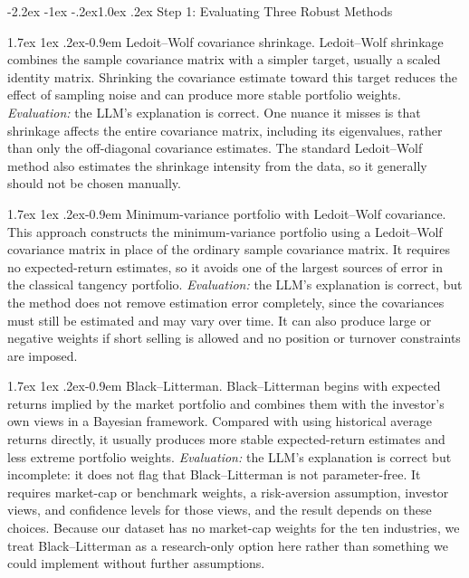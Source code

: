 \documentclass[11pt]{article}
\makeatletter
\renewcommand\subsection{\@startsection{subsection}{2}{0pt}%
  {-2.2ex \@plus -1ex \@minus -.2ex}{1.0ex \@plus .2ex}%
  {\normalfont\bfseries\normalsize\color{psink}}}
\renewcommand\paragraph{\@startsection{paragraph}{4}{0pt}%
  {1.7ex \@plus 1ex \@minus .2ex}{-0.9em}%
  {\normalfont\bfseries\normalsize\color{psink}}}
\makeatother
\begin{document}
\subsection{Step 1: Evaluating Three Robust Methods}

\paragraph{Ledoit--Wolf covariance shrinkage.} Ledoit--Wolf shrinkage combines
the sample covariance matrix with a simpler target, usually a scaled identity
matrix. Shrinking the covariance estimate toward this target reduces the
effect of sampling noise and can produce more stable portfolio weights.
\textit{Evaluation:} the LLM's explanation is correct. One nuance it misses is
that shrinkage affects the entire covariance matrix, including its
eigenvalues, rather than only the off-diagonal covariance estimates. The
standard Ledoit--Wolf method also estimates the shrinkage intensity from the
data, so it generally should not be chosen manually.

\paragraph{Minimum-variance portfolio with Ledoit--Wolf covariance.} This
approach constructs the minimum-variance portfolio using a Ledoit--Wolf
covariance matrix in place of the ordinary sample covariance matrix. It
requires no expected-return estimates, so it avoids one of the largest
sources of error in the classical tangency portfolio. \textit{Evaluation:} the
LLM's explanation is correct, but the method does not remove estimation error
completely, since the covariances must still be estimated and may vary over
time. It can also produce large or negative weights if short selling is
allowed and no position or turnover constraints are imposed.

\paragraph{Black--Litterman.} Black--Litterman begins with expected returns
implied by the market portfolio and combines them with the investor's own
views in a Bayesian framework. Compared with using historical average returns
directly, it usually produces more stable expected-return estimates and less
extreme portfolio weights. \textit{Evaluation:} the LLM's explanation is
correct but incomplete: it does not flag that Black--Litterman is not
parameter-free. It requires market-cap or benchmark weights, a risk-aversion
assumption, investor views, and confidence levels for those views, and the
result depends on these choices. Because our dataset has no market-cap
weights for the ten industries, we treat Black--Litterman as a research-only
option here rather than something we could implement without further
assumptions.
\end{document}
